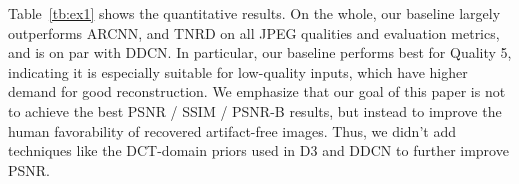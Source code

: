 \documentclass[10pt,twocolumn,letterpaper]{article}
\begin{document}
Table~\ref{tb:ex1} shows the quantitative results. On the whole, our baseline largely outperforms ARCNN, and TNRD on all JPEG qualities and evaluation metrics, and is on par with DDCN. In particular, our baseline performs best for Quality 5, indicating it is especially suitable for low-quality inputs, which have higher demand for good reconstruction. We emphasize that our goal of this paper is not to achieve the best PSNR / SSIM / PSNR-B results, but instead to improve the human favorability of recovered artifact-free images. Thus, we didn't add techniques like the DCT-domain priors used in D3 and DDCN to further improve PSNR.

\begin{table}
\begin{center}
\caption{Comparisons with the State of the Arts on the BSDS500 Dataset. {\color{red}Red color} indicates the best performance; {\color{blue}Blue color} indicates the second best performances.}
\vspace{-1em}
\label{tb:ex1}
\end{center}
\vspace{-2.5em}
\end{table}
\end{document}
